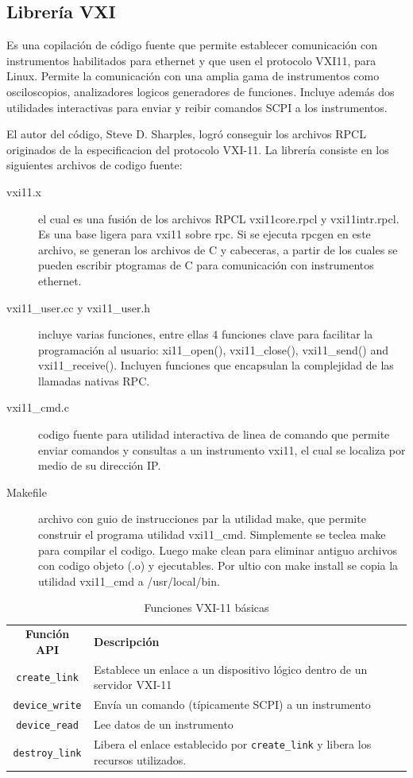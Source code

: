 \documentclass[paper=letter,oneside,fontsize=11pt, parskip=full]{scrartcl}
\begin{document}
		\subsection{Librería VXI}
		Es una copilación de código fuente que permite establecer comunicación con instrumentos habilitados para ethernet y que usen el protocolo VXI11, para Linux. Permite la comunicación con una amplia gama de instrumentos como osciloscopios, analizadores logicos generadores de funciones. Incluye además dos utilidades interactivas para enviar y reibir comandos SCPI a los instrumentos.
		
		El autor del código, Steve D. Sharples,  logró conseguir los archivos RPCL originados de la especificacion del protocolo VXI-11. 
		La librería consiste en los siguientes archivos de codigo fuente:
		
		\begin{description}
			\item[\ttfamily vxi11.x] el cual es una fusión de los archivos RPCL vxi11core.rpcl y vxi11intr.rpcl. Es una base ligera para vxi11 sobre rpc. Si se ejecuta rpcgen en este archivo, se generan los archivos de C y cabeceras, a partir de los cuales se pueden escribir ptogramas de C para comunicación con instrumentos ethernet.
			\item[\ttfamily vxi11\_user.cc y vxi11\_user.h]  incluye varias funciones, entre ellas 4 funciones clave para facilitar la programación al usuario: xi11\_open(), vxi11\_close(), vxi11\_send() and vxi11\_receive(). Incluyen funciones que encapsulan la complejidad de las llamadas nativas RPC.
			\item[\ttfamily vxi11\_cmd.c] codigo fuente para utilidad interactiva de linea de comando que permite enviar comandos y consultas a un instrumento vxi11, el cual se localiza por medio de su dirección IP.
			\item[\ttfamily Makefile] archivo con guio de instrucciones par la utilidad make, que permite construir el programa utilidad vxi11\_cmd. Simplemente se teclea make para compilar el codigo. Luego make clean para eliminar antiguo archivos con codigo objeto (.o) y ejecutables. Por ultio con make install se copia la utilidad vxi11\_cmd a /usr/local/bin.		
		\end{description}
		
		
	
		\begin{table}
			\begin{tabular}{cl}
				\textbf{Función API} 	& \textbf{Descripción} \\
				\texttt{create\_link}	& Establece un enlace a un dispositivo lógico dentro de un servidor VXI-11 \\
				\texttt{device\_write}	& Envía un comando (típicamente SCPI) a un instrumento \\
				\texttt{device\_read}	& Lee datos de un instrumento \\
				\texttt{destroy\_link}	& Libera el enlace establecido por \texttt{create\_link} y libera los recursos utilizados.				
			\end{tabular}
			\caption{Funciones VXI-11 básicas}
		\end{table}
			
\end{document}
